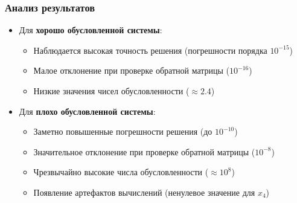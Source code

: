 \documentclass[12pt, a4paper]{article}
\begin{document}
\subsubsection*{Анализ результатов}
\begin{itemize}
\item Для \textbf{хорошо обусловленной системы}:
\begin{itemize}
\item Наблюдается высокая точность решения (погрешности порядка $10^{-15}$)
\item Малое отклонение при проверке обратной матрицы ($10^{-16}$)
\item Низкие значения чисел обусловленности ($\approx 2.4$)
\end{itemize}

\item Для \textbf{плохо обусловленной системы}:
\begin{itemize}
\item Заметно повышенные погрешности решения (до $10^{-10}$)
\item Значительное отклонение при проверке обратной матрицы ($10^{-8}$)
\item Чрезвычайно высокие числа обусловленности ($\approx 10^8$)
\item Появление артефактов вычислений (ненулевое значение для $x_4$)
\end{itemize}
\end{itemize}
\end{document}
